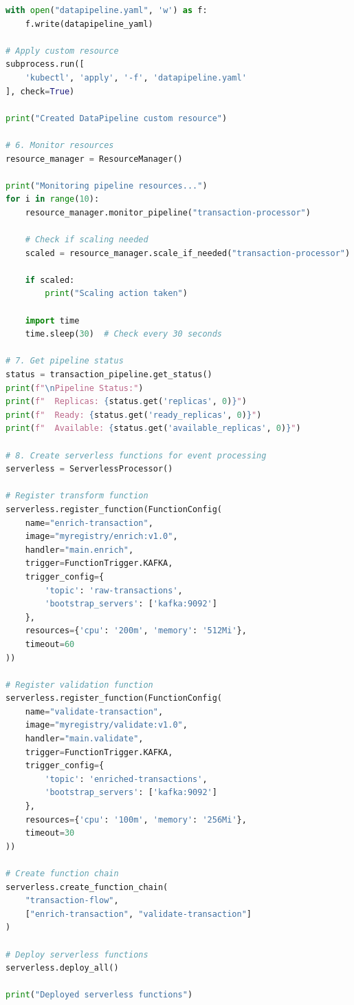 \begin{lstlisting}[language=Python, caption={Complete Kubernetes Migration Example}]
with open("datapipeline.yaml", 'w') as f:
    f.write(datapipeline_yaml)

# Apply custom resource
subprocess.run([
    'kubectl', 'apply', '-f', 'datapipeline.yaml'
], check=True)

print("Created DataPipeline custom resource")

# 6. Monitor resources
resource_manager = ResourceManager()

print("Monitoring pipeline resources...")
for i in range(10):
    resource_manager.monitor_pipeline("transaction-processor")

    # Check if scaling needed
    scaled = resource_manager.scale_if_needed("transaction-processor")

    if scaled:
        print("Scaling action taken")

    import time
    time.sleep(30)  # Check every 30 seconds

# 7. Get pipeline status
status = transaction_pipeline.get_status()
print(f"\nPipeline Status:")
print(f"  Replicas: {status.get('replicas', 0)}")
print(f"  Ready: {status.get('ready_replicas', 0)}")
print(f"  Available: {status.get('available_replicas', 0)}")

# 8. Create serverless functions for event processing
serverless = ServerlessProcessor()

# Register transform function
serverless.register_function(FunctionConfig(
    name="enrich-transaction",
    image="myregistry/enrich:v1.0",
    handler="main.enrich",
    trigger=FunctionTrigger.KAFKA,
    trigger_config={
        'topic': 'raw-transactions',
        'bootstrap_servers': ['kafka:9092']
    },
    resources={'cpu': '200m', 'memory': '512Mi'},
    timeout=60
))

# Register validation function
serverless.register_function(FunctionConfig(
    name="validate-transaction",
    image="myregistry/validate:v1.0",
    handler="main.validate",
    trigger=FunctionTrigger.KAFKA,
    trigger_config={
        'topic': 'enriched-transactions',
        'bootstrap_servers': ['kafka:9092']
    },
    resources={'cpu': '100m', 'memory': '256Mi'},
    timeout=30
))

# Create function chain
serverless.create_function_chain(
    "transaction-flow",
    ["enrich-transaction", "validate-transaction"]
)

# Deploy serverless functions
serverless.deploy_all()

print("Deployed serverless functions")
\end{lstlisting}

